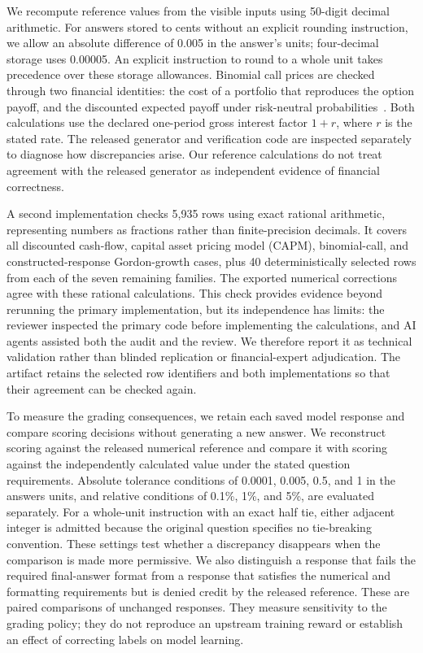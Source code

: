 We recompute reference values from the visible inputs using 50-digit decimal arithmetic. For answers stored to cents without an explicit rounding instruction, we allow an absolute difference of 0.005 in the answer's units; four-decimal storage uses 0.00005. An explicit instruction to round to a whole unit takes precedence over these storage allowances. Binomial call prices are checked through two financial identities: the cost of a portfolio that reproduces the option payoff, and the discounted expected payoff under risk-neutral probabilities~\cite{crr}. Both calculations use the declared one-period gross interest factor $1+r$, where $r$ is the stated rate. The released generator and verification code are inspected separately to diagnose how discrepancies arise. Our reference calculations do not treat agreement with the released generator as independent evidence of financial correctness.

A second implementation checks 5,935 rows using exact rational arithmetic, representing numbers as fractions rather than finite-precision decimals. It covers all discounted cash-flow, capital asset pricing model (CAPM), binomial-call, and constructed-response Gordon-growth cases, plus 40 deterministically selected rows from each of the seven remaining families. The exported numerical corrections agree with these rational calculations. This check provides evidence beyond rerunning the primary implementation, but its independence has limits: the reviewer inspected the primary code before implementing the calculations, and AI agents assisted both the audit and the review. We therefore report it as technical validation rather than blinded replication or financial-expert adjudication. The artifact retains the selected row identifiers and both implementations so that their agreement can be checked again.

To measure the grading consequences, we retain each saved model response and compare scoring decisions without generating a new answer. We reconstruct scoring against the released numerical reference and compare it with scoring against the independently calculated value under the stated question requirements. Absolute tolerance conditions of 0.0001, 0.005, 0.5, and 1 in the answer\textquotesingle s units, and relative conditions of 0.1\%, 1\%, and 5\%, are evaluated separately. For a whole-unit instruction with an exact half tie, either adjacent integer is admitted because the original question specifies no tie-breaking convention. These settings test whether a discrepancy disappears when the comparison is made more permissive. We also distinguish a response that fails the required final-answer format from a response that satisfies the numerical and formatting requirements but is denied credit by the released reference. These are paired comparisons of unchanged responses. They measure sensitivity to the grading policy; they do not reproduce an upstream training reward or establish an effect of correcting labels on model learning.

